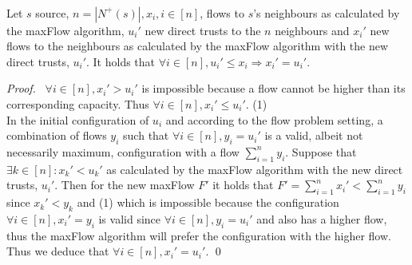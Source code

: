 \documentclass[11pt]{llncs}
\begin{document}
    \begin{theorem} \ \\ 
       \label{saturation}
       Let $s$ source, $n = |N^{+}(s)|, x_i, i \in [n]$, flows to $s$'s neighbours as calculated by the
       maxFlow algorithm, $u_i'$ new direct trusts to the $n$ neighbours and $x_i'$ new flows to the neighbours
       as calculated by the maxFlow algorithm with the new direct trusts, $u_i'$. It holds that
       $\forall i \in [n], u_i' \leq x_i \Rightarrow x_i' = u_i'$.
    \end{theorem}
    \begin{proof} \ 
       $\forall i \in [n], x_i' > u_i'$ is impossible because a flow cannot be higher than its
       corresponding capacity. Thus $\forall i \in [n], x_i' \leq u_i'$. (1) \\
       In the initial configuration of $u_i$ and according to the flow problem setting, a combination of flows
       $y_i$ such that $\forall i \in [n], y_i = u_i'$ is a valid, albeit not necessarily maximum,
       configuration with a flow $\sum\limits_{i=1}^{n}y_i$. Suppose that $\exists k \in [n] : x_k'
       < u_k'$ as calculated by the maxFlow algorithm with the new direct trusts, $u_i'$. Then for the new
       maxFlow $F'$ it holds that $F' = \sum\limits_{i=1}^{n}x_i' < \sum\limits_{i=1}^{n}y_i$ since $x_k' < y_k$
       and (1) which is impossible because the configuration $\forall i \in [n], x_i' = y_i$ is valid since 
       $\forall i \in [n], y_i = u_i'$ and also has a higher flow, thus the maxFlow algorithm will
       prefer the configuration with the higher flow. Thus we deduce that $\forall i \in [n], x_i' = u_i'$. \qed
    \end{proof}
\end{document}
